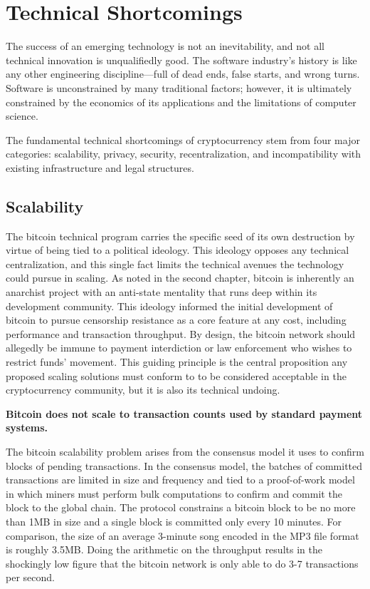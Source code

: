 \chapter{Technical Shortcomings}

The success of an emerging technology is not an inevitability, and not all
technical innovation is unqualifiedly good. The software industry's history is
like any other engineering discipline---full of dead ends, false starts, and
wrong turns. Software is unconstrained by many traditional factors; however, it
is ultimately constrained by the economics of its applications and the
limitations of computer science.

The fundamental technical shortcomings of cryptocurrency stem from four major
categories: scalability, privacy, security, recentralization, and
incompatibility with existing infrastructure and legal structures.


\section{Scalability}

The bitcoin technical program carries the specific seed of its own destruction
by virtue of being tied to a political ideology. This ideology opposes any
technical centralization, and this single fact limits the technical avenues the
technology could pursue in scaling. As noted in the second chapter, bitcoin is
inherently an anarchist project with an anti-state mentality that runs deep
within its development community. This ideology informed the initial development
of bitcoin to pursue censorship resistance as a core feature at any cost,
including performance and transaction throughput. By design, the bitcoin network
should allegedly be immune to payment interdiction or law enforcement who wishes
to restrict funds' movement. This guiding principle is the central proposition
any proposed scaling solutions must conform to to be considered acceptable in
the cryptocurrency community, but it is also its technical undoing.

\begin{infobox}
 \textbf{Bitcoin does not scale to transaction counts used by standard payment systems.}
\end{infobox}

The bitcoin scalability problem arises from the consensus model it uses to
confirm blocks of pending transactions. In the consensus model, the batches of
committed transactions are limited in size and frequency and tied to a
proof-of-work model in which miners must perform bulk computations to confirm
and commit the block to the global chain. The protocol constrains a bitcoin
block to be no more than 1MB in size and a single block is committed only every
10 minutes. For comparison, the size of an average 3-minute song encoded in the
MP3 file format is roughly 3.5MB. Doing the arithmetic on the throughput results
in the shockingly low figure that the bitcoin network is only able to do 3-7
transactions per second.

